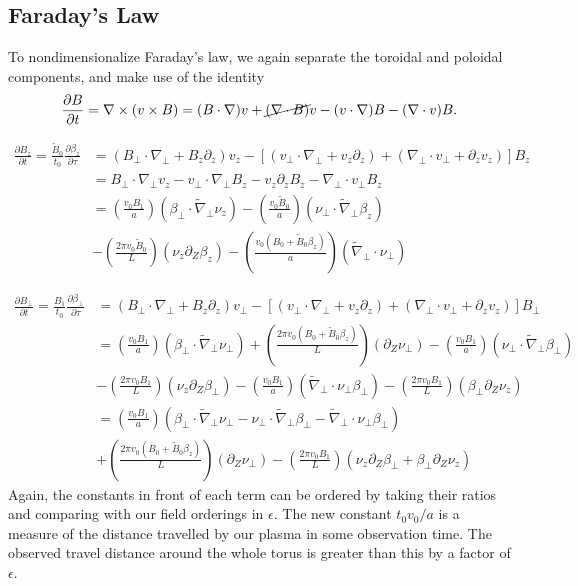 \documentclass{article}
\newcommand{\ep}{\epsilon}
\newcommand{\np}{\nabla_\perp}
\newcommand{\p}{\partial}
\newcommand{\til}[1]{\widetilde{ #1 }}
\newcommand{\deriv}[2]{\frac{\p #1}{\p #2}}
\newcommand{\pth} [1] {\left( #1 \right) }
\newcommand{\br} [1] {\left[ #1 \right] }
\begin{document}
\subsection{Faraday's Law}
To nondimensionalize Faraday's law, we again separate the toroidal and poloidal components, and make use of the identity 
$$\deriv{B}{t} = \nabla \times (v\times B) = 
(B\cdot\nabla)v + \cancel{(\nabla\cdot B)}v - (v\cdot\nabla)B - (\nabla\cdot v)B.$$

\begin{equation} \begin{split}
    \deriv{B_z}{t} = \frac{\til{B}_0}{t_0} \deriv{\beta_z}{\tau} &= 
    \pth{B_\perp\cdot\np + B_z\p_z}v_z - \br{(v_\perp\cdot\np + v_z\p_z) + (\np\cdot v_\perp + \p_zv_z)} B_z \\
    &= B_\perp\cdot\np v_z - v_\perp\cdot\np B_z - v_z\p_zB_z - \np \cdot v_\perp B_z \\ 
    &= \pth{\frac{v_0B_1}{a}} \pth{\beta_\perp \cdot \til{\nabla}_\perp \nu_z} - \pth{\frac{v_0\til{B}_0}{a}} \pth{\nu_\perp\cdot \til{\nabla}_\perp \beta_z} \\
    &- \pth{\frac{2\pi v_0\til{B}_0}{L}} \pth{\nu_z\p_Z\beta_z} - \pth{\frac{v_0(B_0 + \til{B}_0\beta_z)}{a}} \pth{\til{\nabla}_\perp \cdot \nu_\perp} 
\end{split} \end{equation}

\begin{equation} \begin{split}
    \deriv{B_\perp}{t} = \frac{B_1}{t_0} \deriv{\beta_\perp}{\tau} &= 
    \pth{B_\perp\cdot\np + B_z\p_z}v_\perp - \br{(v_\perp\cdot\np + v_z\p_z) + (\np\cdot v_\perp + \p_zv_z)} B_\perp \\
    &= \pth{\frac{v_0B_1}{a}} \pth{\beta_\perp \cdot \til{\nabla}_\perp \nu_\perp} + \pth{\frac{2\pi v_0 \pth{B_0 + \til{B}_0\beta_z}}{L}} \pth{\p_Z\nu_\perp} 
    - \pth{\frac{v_0B_1}{a}} \pth{\nu_\perp \cdot \til{\nabla}_\perp \beta_\perp} \\ 
    &- \pth{\frac{2\pi v_0B_1}{L}} \pth{\nu_z\p_Z \beta_\perp} - \pth{\frac{v_0B_1}{a}} \pth{\til{\nabla}_\perp \cdot \nu_\perp \beta_\perp} - \pth{\frac{2\pi v_0B_1}{L}} \pth{\beta_\perp \p_Z\nu_z} \\ 
    &= \pth{\frac{v_0B_1}{a}} \pth{\beta_\perp \cdot \til{\nabla}_\perp \nu_\perp - \nu_\perp \cdot \til{\nabla}_\perp \beta_\perp - \til{\nabla}_\perp \cdot \nu_\perp\beta_\perp} \\ 
    &+ \pth{\frac{2\pi v_0 \pth{B_0 + \til{B}_0\beta_z}}{L}} \pth{\p_Z\nu_\perp} 
    - \pth{\frac{2\pi v_0B_1}{L}} \pth{\nu_z\p_Z\beta_\perp + \beta_\perp \p_Z\nu_z}
\end{split} \end{equation}
Again, the constants in front of each term can be ordered by taking their ratios and comparing with our field orderings in $\ep$. The new constant $t_0v_0/a$ is a measure of the distance travelled by our plasma in some observation time. The observed travel distance around the whole torus is greater than this by a factor of $\ep$. 
\end{document}
